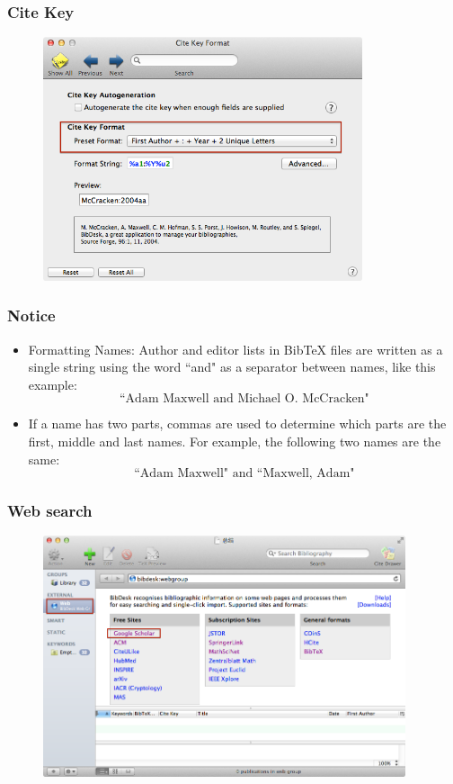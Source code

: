 \documentclass[notheorems,mathserif,table,compress,dvipsnames]{beamer}  %
\begin{document}
%
\begin{frame}
\frametitle{Cite Key}
\begin{figure}[!ht]
\includegraphics[width=3.7in]{bibdesk7}
\end{figure} 
\end{frame}

%
\begin{frame}
\frametitle{Notice}
\begin{itemize}
\item Formatting Names: Author and editor lists in BibTeX files are written as a single string using the word ``and" as a separator between names, like this example:
\begin{displaymath}
\textrm{``Adam Maxwell and Michael O. McCracken"}
\end{displaymath}

\item If a name has two parts, commas are used to determine which parts are the first, middle and last names. For example, the following two names are the same: 
\begin{displaymath}
\textrm{``Adam Maxwell" and ``Maxwell, Adam"}
\end{displaymath}
 
\end{itemize}
\end{frame}


%
\begin{frame}
\frametitle{Web search}
\begin{figure}[!ht]
\includegraphics[width=4.2in]{bibdesk4}
\end{figure} 
\end{frame}
\end{document}
